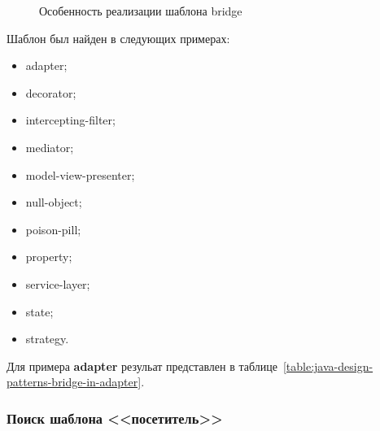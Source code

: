 \begin{figure}[!ht]
\centering
\caption{Особенность реализации шаблона bridge}
\label{fig:java-design-patterns-bridge}
\end{figure}

Шаблон был найден в следующих примерах:
\begin{itemize}
\item adapter;
\item decorator;
\item intercepting-filter;
\item mediator;
\item model-view-presenter;
\item null-object;
\item poison-pill;
\item property;
\item service-layer;
\item state;
\item strategy.
\end{itemize}

Для примера \textbf{adapter} резульат представлен в
таблице~\ref{table:java-design-patterns-bridge-in-adapter}.

\subsubsection{Поиск шаблона <<посетитель>>}
